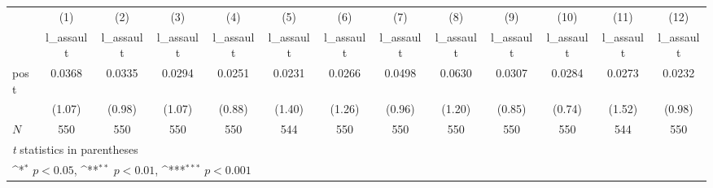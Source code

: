 {
\def\sym#1{\ifmmode^{#1}\else\(^{#1}\)\fi}
\begin{tabular}{l*{12}{c}}
\hline\hline
            &\multicolumn{1}{c}{(1)}&\multicolumn{1}{c}{(2)}&\multicolumn{1}{c}{(3)}&\multicolumn{1}{c}{(4)}&\multicolumn{1}{c}{(5)}&\multicolumn{1}{c}{(6)}&\multicolumn{1}{c}{(7)}&\multicolumn{1}{c}{(8)}&\multicolumn{1}{c}{(9)}&\multicolumn{1}{c}{(10)}&\multicolumn{1}{c}{(11)}&\multicolumn{1}{c}{(12)}\\
            &\multicolumn{1}{c}{l\_assault}&\multicolumn{1}{c}{l\_assault}&\multicolumn{1}{c}{l\_assault}&\multicolumn{1}{c}{l\_assault}&\multicolumn{1}{c}{l\_assault}&\multicolumn{1}{c}{l\_assault}&\multicolumn{1}{c}{l\_assault}&\multicolumn{1}{c}{l\_assault}&\multicolumn{1}{c}{l\_assault}&\multicolumn{1}{c}{l\_assault}&\multicolumn{1}{c}{l\_assault}&\multicolumn{1}{c}{l\_assault}\\
\hline
post        &      0.0368         &      0.0335         &      0.0294         &      0.0251         &      0.0231         &      0.0266         &      0.0498         &      0.0630         &      0.0307         &      0.0284         &      0.0273         &      0.0232         \\
            &      (1.07)         &      (0.98)         &      (1.07)         &      (0.88)         &      (1.40)         &      (1.26)         &      (0.96)         &      (1.20)         &      (0.85)         &      (0.74)         &      (1.52)         &      (0.98)         \\
\hline
\(N\)       &         550         &         550         &         550         &         550         &         544         &         550         &         550         &         550         &         550         &         550         &         544         &         550         \\
\hline\hline
\multicolumn{13}{l}{\footnotesize \textit{t} statistics in parentheses}\\
\multicolumn{13}{l}{\footnotesize \sym{*} \(p<0.05\), \sym{**} \(p<0.01\), \sym{***} \(p<0.001\)}\\
\end{tabular}
}

